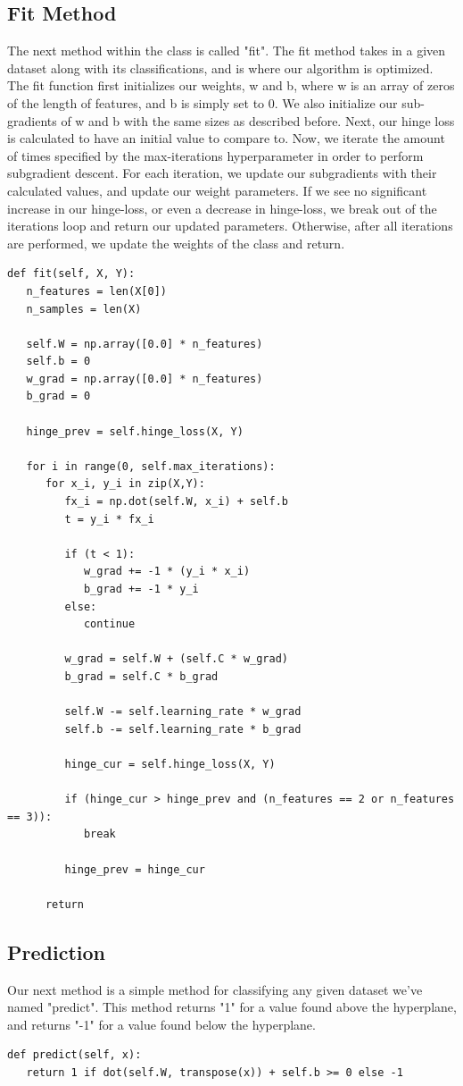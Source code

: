 \documentclass[12pt]{article}%
\begin{document}
	\subsection{Fit Method}
	The next method within the class is called "fit".  The fit method takes in a given dataset along with its classifications, and is where our algorithm is optimized.  The fit function first initializes our weights, w and b, where w is an array of zeros of the length of features, and b is simply set to 0.  We also initialize our sub-gradients of w and b with the same sizes as described before.  Next, our hinge loss is calculated to have an initial value to compare to.  Now, we iterate the amount of times specified by the max-iterations hyperparameter in order to perform subgradient descent.  For each iteration, we update our subgradients with their calculated values, and update our weight parameters.  If we see no significant increase in our hinge-loss, or even a decrease in hinge-loss, we break out of the iterations loop and return our updated parameters.  Otherwise, after all iterations are performed, we update the weights of the class and return.
\begin{verbatim}
def fit(self, X, Y):
   n_features = len(X[0])
   n_samples = len(X)

   self.W = np.array([0.0] * n_features)
   self.b = 0 
   w_grad = np.array([0.0] * n_features)
   b_grad = 0

   hinge_prev = self.hinge_loss(X, Y)

   for i in range(0, self.max_iterations):
      for x_i, y_i in zip(X,Y):
         fx_i = np.dot(self.W, x_i) + self.b
         t = y_i * fx_i

         if (t < 1):
            w_grad += -1 * (y_i * x_i)
            b_grad += -1 * y_i
         else:
            continue

         w_grad = self.W + (self.C * w_grad)
         b_grad = self.C * b_grad

         self.W -= self.learning_rate * w_grad
         self.b -= self.learning_rate * b_grad

         hinge_cur = self.hinge_loss(X, Y)

         if (hinge_cur > hinge_prev and (n_features == 2 or n_features == 3)):
            break

         hinge_prev = hinge_cur

      return
\end{verbatim}
	\subsection{Prediction}
	Our next method is a simple method for classifying any given dataset we've named "predict".  This method returns "1" for a value found above the hyperplane, and returns "-1" for a value found below the hyperplane.
\begin{verbatim}
def predict(self, x):
   return 1 if dot(self.W, transpose(x)) + self.b >= 0 else -1
\end{verbatim}
\end{document}

